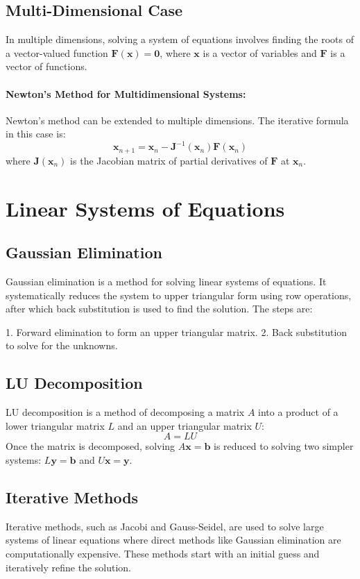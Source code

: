 \documentclass[12pt]{article}
\begin{document}
\subsection{Multi-Dimensional Case}
In multiple dimensions, solving a system of equations involves finding the roots of a vector-valued function \( \mathbf{F}(\mathbf{x}) = \mathbf{0} \), where \( \mathbf{x} \) is a vector of variables and \( \mathbf{F} \) is a vector of functions. 

\paragraph{Newton's Method for Multidimensional Systems:}
Newton's method can be extended to multiple dimensions. The iterative formula in this case is:
\[
\mathbf{x}_{n+1} = \mathbf{x}_n - \mathbf{J}^{-1}(\mathbf{x}_n) \mathbf{F}(\mathbf{x}_n)
\]
where \( \mathbf{J}(\mathbf{x}_n) \) is the Jacobian matrix of partial derivatives of \( \mathbf{F} \) at \( \mathbf{x}_n \).

\section{Linear Systems of Equations}
\subsection{Gaussian Elimination}
Gaussian elimination is a method for solving linear systems of equations. It systematically reduces the system to upper triangular form using row operations, after which back substitution is used to find the solution. The steps are:

1. Forward elimination to form an upper triangular matrix.
2. Back substitution to solve for the unknowns.

\subsection{LU Decomposition}
LU decomposition is a method of decomposing a matrix \( A \) into a product of a lower triangular matrix \( L \) and an upper triangular matrix \( U \):
\[
A = LU
\]
Once the matrix is decomposed, solving \( A\mathbf{x} = \mathbf{b} \) is reduced to solving two simpler systems: \( L\mathbf{y} = \mathbf{b} \) and \( U\mathbf{x} = \mathbf{y} \).

\subsection{Iterative Methods}
Iterative methods, such as Jacobi and Gauss-Seidel, are used to solve large systems of linear equations where direct methods like Gaussian elimination are computationally expensive. These methods start with an initial guess and iteratively refine the solution.
\end{document}
